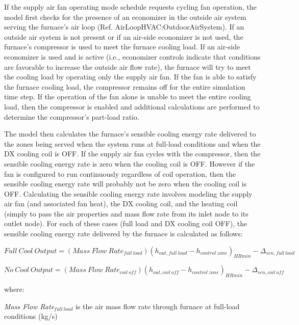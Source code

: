 If the supply air fan operating mode schedule requests cycling fan operation, the model first checks for the presence of an economizer in the outside air system serving the furnace's air loop (Ref. AirLoopHVAC:OutdoorAirSystem). If an outside air system is not present or if an air-side economizer is not used, the furnace's compressor is used to meet the furnace cooling load. If an air-side economizer is used and is active (i.e., economizer controls indicate that conditions are favorable to increase the outside air flow rate), the furnace will try to meet the cooling load by operating only the supply air fan. If the fan is able to satisfy the furnace cooling load, the compressor remains off for the entire simulation time step. If the operation of the fan alone is unable to meet the entire cooling load, then the compressor is enabled and additional calculations are performed to determine the compressor's part-load ratio.

The model then calculates the furnace's sensible cooling energy rate delivered to the zones being served when the system runs at full-load conditions and when the DX cooling coil is OFF. If the supply air fan cycles with the compressor, then the sensible cooling energy rate is zero when the cooling coil is OFF. However if the fan is configured to run continuously regardless of coil operation, then the sensible cooling energy rate will probably not be zero when the cooling coil is OFF. Calculating the sensible cooling energy rate involves modeling the supply air fan (and associated fan heat), the DX cooling coil, and the heating coil (simply to pass the air properties and mass flow rate from its inlet node to its outlet node). For each of these cases (full load and DX cooling coil OFF), the sensible cooling energy rate delivered by the furnace is calculated as follows:

\begin{equation}
Full~Cool~Output = (Mass~Flow~Rat{e_{full~load}}){({h_{out,full~load}} - {h_{control~zone}})_{HRmin}} - {\Delta_{sen,full~load}}
\end{equation}

\begin{equation}
No~Cool~Output = (Mass~Flow~Rat{e_{coil~off}}){({h_{out,coil~off}} - {h_{control~zone}})_{HRmin}} - {\Delta_{sen,coil~off}}
\end{equation}

where:

\emph{Mass Flow Rate\(_{full~load}\)} is the air mass flow rate through furnace at full-load conditions (kg/s)

